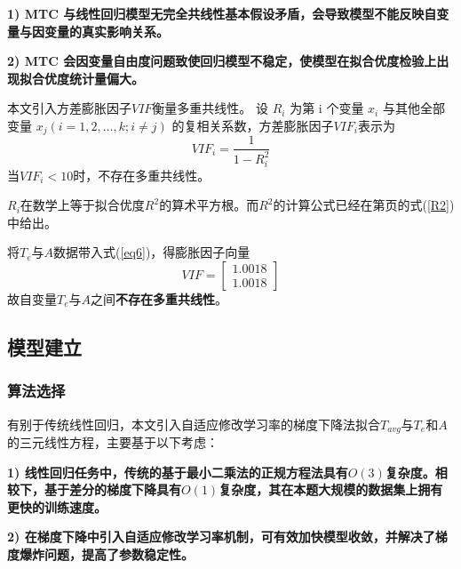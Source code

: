 \documentclass[withoutpreface,bwprint]{cumcmthesis}  %
\begin{document}
        \textbf{1) MTC 与线性回归模型无完全共线性基本假设矛盾，会导致模型不能反映自变量与因变量的真实影响关系。}
        
	\textbf{2) MTC 会因变量自由度问题致使回归模型不稳定，使模型在拟合优度检验上出现拟合优度统计量偏大。}	
 
	本文引入方差膨胀因子$VIF$衡量多重共线性。
        设 $R_{i}$  为第  $\mathrm{i}$  个变量  $x_{i}$  与其他全部变量  $x_{j}(i=1,2, \ldots, k ; i \neq j)$  的复相关系数，方差膨胀因子$VIF_{i}$表示为
        \begin{equation}\label{eq6}
        VIF_{i}=\frac{1}{1-R_{i}^{2}}
        \end{equation}
        当$VIF_{i}<10$时，不存在多重共线性。
        
        $R_{i}$在数学上等于拟合优度$R^{2}$的算术平方根。而$R^{2}$的计算公式已经在第\pageref{R2}页的式(\ref{R2})中给出。
        
        将$T_{e}$与$A$数据带入式(\ref{eq6})，得膨胀因子向量
        \[
        VIF=\begin{bmatrix}1.0018\\1.0018\end{bmatrix}
        \]
        故自变量$T_{e}$与$A$之间\textbf{不存在多重共线性}。
	
	\subsection{模型建立}
 
        \subsubsection{算法选择}
        \label{grad}
        有别于传统线性回归，本文引入自适应修改学习率的梯度下降法拟合$T_{avg}$与$T_{e}$和$A$的三元线性方程，主要基于以下考虑：
        
        \textbf{1) 线性回归任务中，传统的基于最小二乘法的正规方程法具有$O(3)$复杂度。相较下，基于差分的梯度下降具有$O(1)$复杂度，其在本题大规模的数据集上拥有更快的训练速度。}
        
	\textbf{2) 在梯度下降中引入自适应修改学习率机制，可有效加快模型收敛，并解决了梯度爆炸问题，提高了参数稳定性。}	
\end{document}
